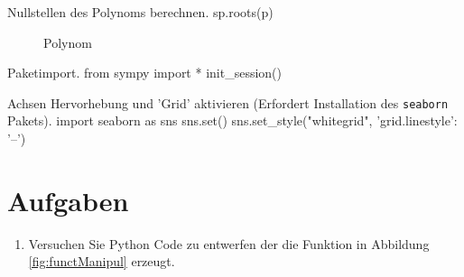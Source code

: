\begin{python}{Nullstellen des Polynoms berechnen.}
sp.roots(p)
\end{python}

\begin{figure}[tb]
	\centering
	
	\caption{Polynom}
	\label{fig:poly1}
\end{figure}






\begin{python}{Paketimport.}
from sympy import *
init_session()
\end{python}


\begin{python}{Achsen Hervorhebung und 'Grid' aktivieren (Erfordert Installation des \texttt{seaborn} Pakets).}
import seaborn as sns
sns.set()
sns.set_style("whitegrid", {'grid.linestyle': '--'})
\end{python}

\section{Aufgaben}

\begin{enumerate}
\item Versuchen Sie Python Code zu entwerfen der die Funktion in Abbildung \ref{fig:functManipul} erzeugt.
\end{enumerate}
